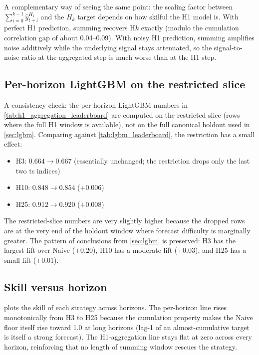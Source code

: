 A complementary way of seeing the same point: the scaling factor between $\sum_{i=0}^{k-1} \hat y^{H_1}_{t+i}$ and the $H_k$ target depends on how skilful the H1 model is. With perfect H1 prediction, summing recovers H$k$ exactly (modulo the cumulation correlation gap of about 0.04--0.09). With noisy H1 prediction, summing amplifies noise additively while the underlying signal stays attenuated, so the signal-to-noise ratio at the aggregated step is much worse than at the H1 step.

\subsection{Per-horizon LightGBM on the restricted slice}
\label{sec:analysis:per_horizon_restricted}

A consistency check: the per-horizon LightGBM numbers in \cref{tab:h1_aggregation_leaderboard} are computed on the restricted slice (rows where the full H1 window is available), not on the full canonical holdout used in \cref{sec:lgbm}. Comparing against \cref{tab:lgbm_leaderboard}, the restriction has a small effect:

\begin{itemize}
  \item H3: $0.664 \to 0.667$ (essentially unchanged; the restriction drops only the last two ts indices)
  \item H10: $0.848 \to 0.854$ ($+0.006$)
  \item H25: $0.912 \to 0.920$ ($+0.008$)
\end{itemize}

The restricted-slice numbers are very slightly higher because the dropped rows are at the very end of the holdout window where forecast difficulty is marginally greater. The pattern of conclusions from \cref{sec:lgbm} is preserved: H3 has the largest lift over Naive ($+0.20$), H10 has a moderate lift ($+0.03$), and H25 has a small lift ($+0.01$).

\subsection{Skill versus horizon}
\label{sec:analysis:skill_vs_h}

 plots the skill of each strategy across horizons. The per-horizon line rises monotonically from H3 to H25 because the cumulation property makes the Naive floor itself rise toward 1.0 at long horizons (lag-1 of an almost-cumulative target is itself a strong forecast). The H1-aggregation line stays flat at zero across every horizon, reinforcing that no length of summing window rescues the strategy.

